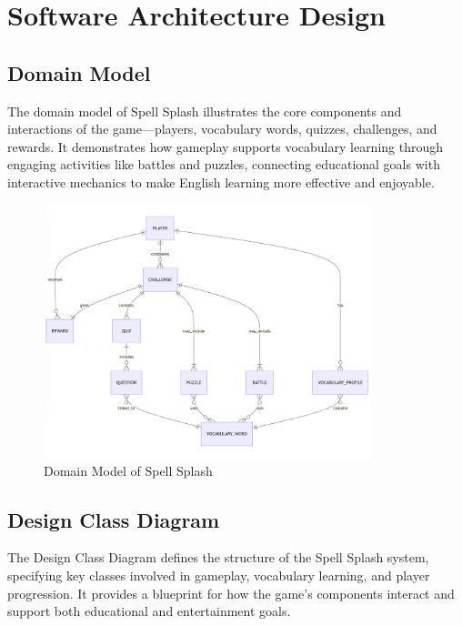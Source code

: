 \chapter{Software Architecture Design}
\label{chap:software-architecture-design}

\section{Domain Model}
\label{section:domain-model}
The domain model of Spell Splash illustrates the core components and interactions of the game—players, 
vocabulary words, quizzes, challenges, and rewards. It demonstrates how gameplay supports vocabulary 
learning through engaging activities like battles and puzzles, connecting educational goals with interactive 
mechanics to make English learning more effective and enjoyable.
\begin{figure}[H]
    \centering
    \includegraphics[width=0.85\textwidth]{assets/ku/er_diagram.png}
    \caption{Domain Model of Spell Splash}
    \label{fig:domain-model}
\end{figure}

\section{Design Class Diagram}
\label{section:design-class-diagram}
The Design Class Diagram defines the structure of the Spell Splash system, specifying 
key classes involved in gameplay, vocabulary learning, and player progression. It provides 
a blueprint for how the game's components interact and support both educational and entertainment goals.

\vspace{1em}

